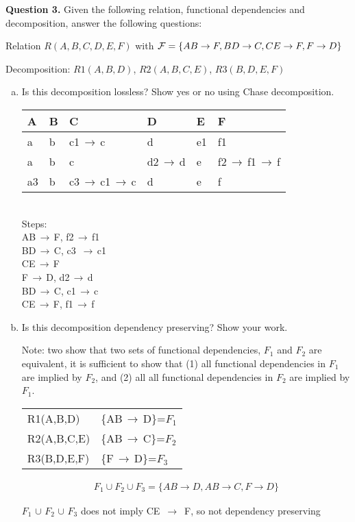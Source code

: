 \documentclass[11pt]{article}
\begin{document}
\newpage

{\bf Question 3.} Given the following relation, functional
dependencies and decomposition, answer the following questions:

Relation $R(A,B,C,D,E,F)$ with ${\cal F}= \{AB\rightarrow F, BD\rightarrow C, CE\rightarrow F, F\rightarrow D \}$

Decomposition: $R1(A,B,D)$, $R2(A,B,C,E)$, $R3(B,D,E,F)$

\begin{enumerate}[(a)]

\item Is this decomposition lossless? Show yes or no using Chase decomposition.


\begin{tabular}{|l|l|l|l|l|l|}
\hline
A    & B & C    & D    & E    & F    \\ \hline
a    & b & c1$\,\to\,$c & d    & e1 & f1 \\ \hline
a    & b & c    & d2$\,\to\,$d & e    & f2$\,\to\,$f1$\,\to\,$f \\ \hline
a3 & b & c3$\,\to\,$c1$\,\to\,$c & d    & e    & f    \\ \hline
\end{tabular}
\medskip
\\
Steps: \\
AB$\,\to\,$F, f2$\,\to\,$f1\\
BD$\,\to\,$C, c3 $\,\to\,$c1\\
CE$\,\to\,$F\\
F$\,\to\,$D, d2$\,\to\,$d\\
BD$\,\to\,$C, c1$\,\to\,$c\\
CE$\,\to\,$F, f1$\,\to\,$f


\item Is this decomposition dependency preserving? Show your work.

Note: two show that two sets of functional dependencies, $F_1$ and
$F_2$ are equivalent, it is sufficient to show that (1) all functional
dependencies in $F_1$ are implied by $F_2$, and (2) all all functional
dependencies in $F_2$ are implied by $F_1$.

\begin{tabular}{ll}
R1(A,B,D) & \{AB$\,\to\,$D\}=$F_1$ \\
R2(A,B,C,E) & \{AB$\,\to\,$C\}=$F_2$ \\
R3(B,D,E,F) & \{F$\,\to\,$D\}=$F_3$
\end{tabular}

\begin{eqnarray*}
F_1 \cup F_2 \cup F_3 = \{AB \rightarrow D, AB \rightarrow C, F \rightarrow D\}
\end{eqnarray*}

$F_1$ $\cup$ $F_2$ $\cup$ $F_3$ does not imply CE $\,\to\,$ F, so not dependency preserving


  
\end{enumerate}
\end{document}
